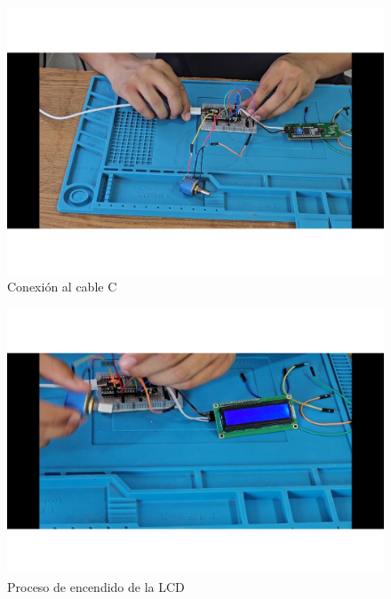     
    \begin{figure}[H]
        \centering
        \includegraphics[trim = {7mm 1mm 1mm 1mm},clip,scale=0.25]{22/Img/e10.pdf}
        \caption{Conexión al cable C}
        \label{fig:evi4}
    \end{figure}
    
    
    \begin{figure}[H]
        \centering
        \includegraphics[trim = {7mm 1mm 1mm 1mm},clip,scale=0.25]{22/Img/e12.pdf}
        \caption{Proceso de encendido de la LCD}
        \label{fig:evi5}
    \end{figure}
    
